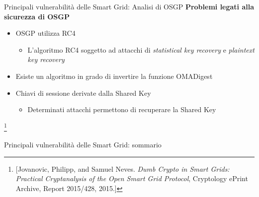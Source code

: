 
\begin{frame}{Principali vulnerabilità delle Smart Grid: Analisi di OSGP}
	\textbf{Problemi legati alla sicurezza di OSGP}	
	\begin{itemize}[<+- | alert@+>]
		\item OSGP utilizza RC4
		\begin{itemize}
			\item L'algoritmo RC4 soggetto ad attacchi di \emph{statistical key recovery} e \emph{plaintext key recovery}
		\end{itemize}			
		\item Esiste un algoritmo in grado di invertire la funzione OMADigest
		\item Chiavi di sessione derivate dalla Shared Key
			\begin{itemize}
				\item Determinati attacchi permettono di recuperare la Shared Key
			\end{itemize}
	\end{itemize}
	\let\thefootnote\relax\footnote{[Jovanovic, Philipp, and Samuel Neves. \emph{Dumb Crypto in Smart Grids: Practical Cryptanalysis of the Open Smart Grid Protocol}, Cryptology ePrint Archive, Report 2015/428, 2015.]}
\end{frame}

\begin{frame}{Principali vulnerabilità delle Smart Grid: sommario}
\end{frame}

